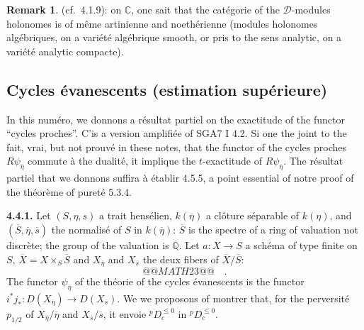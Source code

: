 \documentclass[12pt,a4paper]{article}
\theoremstyle{plain}
\theoremstyle{definition}
\newtheorem{remark}[theorem]{Remark}
\begin{document}
{{\begin{remark}\label{rem:4.3.5}
(cf.\ 4.1.9): on $\mathbb{C}$, one sait that the cat\'{e}gorie of the $\mathcal{D}$-modules holonomes is of m\^{e}me artinienne and noeth\'{e}rienne (modules holonomes alg\'{e}briques, on a vari\'{e}t\'{e} alg\'{e}brique smooth, or pris to the sens analytic, on a vari\'{e}t\'{e} analytic compacte).
\end{remark}

\subsection{Cycles \'{e}vanescents (estimation sup\'{e}rieure)}

In this num\'{e}ro, we donnons a r\'{e}sultat partiel on the exactitude of the functor ``cycles proches''. C'is a version amplifi\'{e}e of SGA7 I 4.2. Si one the joint to the fait, vrai, but not prouv\'{e} in these notes, that the functor of the cycles proches $R\psi_{\overline{\eta}}$ commute \`{a} the dualit\'{e}, it implique the $t$-exactitude of $R\psi_{\overline{\eta}}$. The r\'{e}sultat partiel that we donnons suffira \`{a} \'{e}tablir 4.5.5, a point essential of notre proof of the th\'{e}or\`{e}me of puret\'{e} 5.3.4.

\noindent\textbf{4.4.1.} Let $(S,\eta,s)$ a trait hens\'{e}lien, $k(\overline{\eta})$ a cl\^{o}ture s\'{e}parable of $k(\eta)$, and $(\overline{S},\overline{\eta},\overline{s})$ the normalis\'{e} of $S$ in $k(\overline{\eta})$: $\overline{S}$ is the spectre of a ring of valuation not discr\`{e}te; the group of the valuation is $\mathbb{Q}$. Let $a: X \longrightarrow S$ a sch\'{e}ma of type finite on $S$, $\overline{X} = X \times_{S} \overline{S}$ and $X_{\overline{\eta}}$ and $X_{\overline{s}}$ the deux fibers of $\overline{X}/\overline{S}$:
\[
@@MATH23@@
\quad.
\]
The functor $\psi_{\overline{\eta}}$ of the th\'{e}orie of the cycles \'{e}vanescents is the functor $i^{*}j_{*}: D(X_{\overline{\eta}}) \longrightarrow D(X_{\overline{s}})$. We we proposons of montrer that, for the perversit\'{e} $p_{1/2}$ of $X_{\overline{\eta}}/\overline{\eta}$ and $X_{\overline{s}}/\overline{s}$, it envoie ${}^{p}D_{c}^{\leq 0}$ in ${}^{p}D_{c}^{\leq 0}$.

}}
\end{document}
